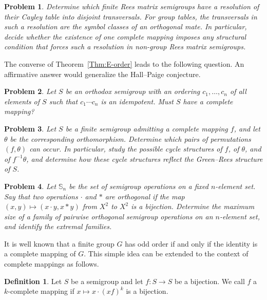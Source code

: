 \documentclass[11pt]{article}
\theoremstyle{plain}
\newtheorem{problem}{Problem}[section]
\theoremstyle{remark}
\theoremstyle{definition}
\newtheorem{definition}[theorem]{Definition}
\theoremstyle{plain}
\begin{document}
\begin{problem}\label{p:resolvable-transversals}
{Determine which finite Rees matrix semigroups have a resolution
of their Cayley table into disjoint transversals. For group tables, the
transversals in such a resolution are the symbol classes of an orthogonal
mate. In particular, decide whether the existence of one complete mapping
imposes any structural condition that forces such a resolution in non-group
Rees matrix semigroups.}
\end{problem}

The converse of Theorem~\ref{Thm:E-order} leads to the following question.
An affirmative answer would generalize the Hall--Paige conjecture.

\begin{problem}
Let $S$ be an orthodox semigroup with an ordering $c_1,\ldots,c_n$ of all elements of $S$ such that $c_1\cdots c_n$ is an idempotent. Must $S$ have a complete mapping?
\end{problem}

\begin{problem}\label{p:permutation-structure}
Let $S$ be a finite semigroup admitting a complete mapping $f$, and let $\theta$ be the corresponding orthomorphism. Determine which pairs of permutations $(f,\theta)$ can occur. In particular, study the possible cycle structures of $f$, of $\theta$, and of $f^{-1}\theta$, and determine how these cycle structures reflect the Green--Rees structure of $S$.
\end{problem}

\begin{problem}\label{p:orthogonal-semigroup-cliques}
Let $\mathbb S_n$ be the set of semigroup operations on a fixed $n$-element set. Say that two operations $\cdot$ and $\ast$ are orthogonal if the map
\((x,y)\longmapsto (x\cdot y,x\ast y)\)
from $X^2$ to $X^2$ is a bijection. Determine the maximum size of a family of pairwise orthogonal semigroup operations on an $n$-element set, and identify the extremal families.
\end{problem}

It is well known that a finite group $G$ has odd order if and only if the identity is a complete mapping of $G$. This simple idea can be extended to the context of complete mappings as follows.

\begin{definition}
Let $S$ be a semigroup and let $f\colon S\to S$ be a bijection. We call $f$ a $k$-complete mapping if
\(x\mapsto x\cdot(xf)^k\)
is a bijection.
\end{definition}
\end{document}
